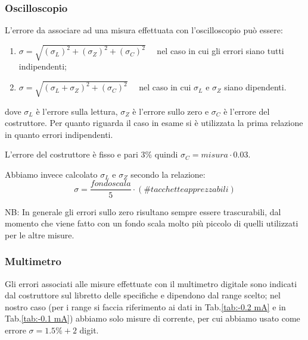 \documentclass[a4paper, 11pt]{article}
\begin{document}
\subsubsection{Oscilloscopio}
L'errore da associare ad una misura effettuata con l'oscilloscopio può essere:
\begin{enumerate}
    \item $\sigma = \sqrt{(\sigma_L)^2 + (\sigma_Z)^2 + (\sigma_C)^2} \quad$ nel caso in cui gli errori siano tutti indipendenti;
    \item  $\sigma = \sqrt{(\sigma_L + \sigma_Z)^2 + (\sigma_C)^2} \quad$ nel caso in cui $\sigma_L$ e $\sigma_Z$ siano dipendenti.
    \end{enumerate}
dove $\sigma_L$ è l'errore sulla lettura, $\sigma_Z$ è l'errore sullo zero e $\sigma_C$ è l'errore del costruttore. Per quanto riguarda il caso in esame si è utilizzata la prima relazione in quanto errori indipendenti.

L'errore del costruttore è fisso e pari 3\% quindi $\sigma_C = misura \cdot 0.03$.

Abbiamo invece calcolato $\sigma_L$ e $\sigma_Z$ secondo la relazione: 
\begin{equation*}
    \sigma = \frac{fondo scala}{5} \cdot ( \# tacchette apprezzabili)
\end{equation*}

NB: In generale gli errori sullo zero risultano sempre essere trascurabili, dal momento che viene fatto con un fondo scala molto più piccolo di quelli utilizzati per le altre misure.

\subsubsection{Multimetro}
Gli errori associati alle misure effettuate con il multimetro digitale sono indicati dal costruttore sul libretto delle specifiche e dipendono dal range scelto; nel nostro caso (per i range si faccia riferimento ai dati in Tab.\ref{tab:-0.2 mA} e in Tab.\ref{tab:-0.1 mA}) abbiamo solo misure di corrente, per cui abbiamo usato come errore $\sigma = 1.5\% + 2$ digit.
\end{document}
